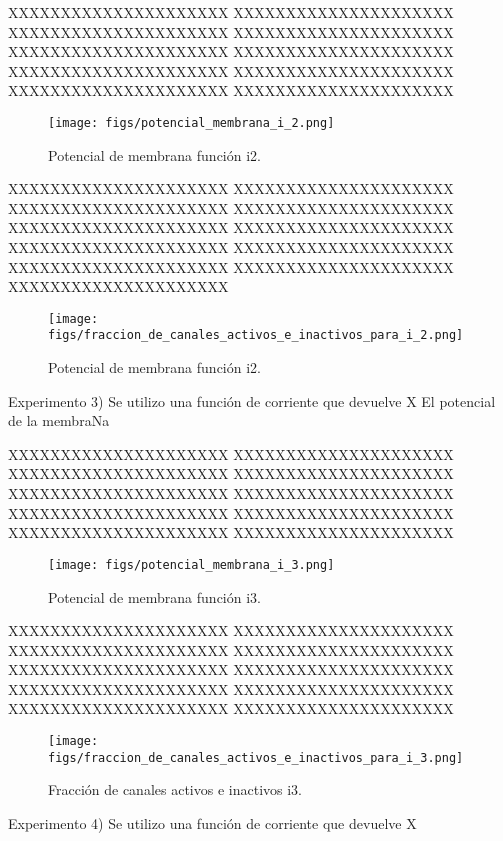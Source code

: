 \documentclass[aps,prl,twocolumn,groupedaddress]{revtex4-2}
\begin{document}
XXXXXXXXXXXXXXXXXXXXX
XXXXXXXXXXXXXXXXXXXXX
XXXXXXXXXXXXXXXXXXXXX
XXXXXXXXXXXXXXXXXXXXX
XXXXXXXXXXXXXXXXXXXXX
XXXXXXXXXXXXXXXXXXXXX
XXXXXXXXXXXXXXXXXXXXX
XXXXXXXXXXXXXXXXXXXXX
XXXXXXXXXXXXXXXXXXXXX
XXXXXXXXXXXXXXXXXXXXX


\begin{figure}[h!]
\centering
\texttt{[image: figs/potencial\_membrana\_i\_2.png]}
\caption{Potencial de membrana función i2. \label{fig3}}
\end{figure}


XXXXXXXXXXXXXXXXXXXXX
XXXXXXXXXXXXXXXXXXXXX
XXXXXXXXXXXXXXXXXXXXX
XXXXXXXXXXXXXXXXXXXXX
XXXXXXXXXXXXXXXXXXXXX
XXXXXXXXXXXXXXXXXXXXX
XXXXXXXXXXXXXXXXXXXXX
XXXXXXXXXXXXXXXXXXXXX
XXXXXXXXXXXXXXXXXXXXX
XXXXXXXXXXXXXXXXXXXXX
XXXXXXXXXXXXXXXXXXXXX


\begin{figure}[h!]
\centering
\texttt{[image: figs/fraccion\_de\_canales\_activos\_e\_inactivos\_para\_i\_2.png]}
\caption{Potencial de membrana función i2. \label{fig4}}
\end{figure}

Experimento 3) Se utilizo una función de corriente que devuelve X
El potencial de la membraNa

XXXXXXXXXXXXXXXXXXXXX
XXXXXXXXXXXXXXXXXXXXX
XXXXXXXXXXXXXXXXXXXXX
XXXXXXXXXXXXXXXXXXXXX
XXXXXXXXXXXXXXXXXXXXX
XXXXXXXXXXXXXXXXXXXXX
XXXXXXXXXXXXXXXXXXXXX
XXXXXXXXXXXXXXXXXXXXX
XXXXXXXXXXXXXXXXXXXXX
XXXXXXXXXXXXXXXXXXXXX


\begin{figure}[h!]
\centering
\texttt{[image: figs/potencial\_membrana\_i\_3.png]}
\caption{Potencial de membrana función i3. \label{fig5}}
\end{figure}
XXXXXXXXXXXXXXXXXXXXX
XXXXXXXXXXXXXXXXXXXXX
XXXXXXXXXXXXXXXXXXXXX
XXXXXXXXXXXXXXXXXXXXX
XXXXXXXXXXXXXXXXXXXXX
XXXXXXXXXXXXXXXXXXXXX
XXXXXXXXXXXXXXXXXXXXX
XXXXXXXXXXXXXXXXXXXXX
XXXXXXXXXXXXXXXXXXXXX
XXXXXXXXXXXXXXXXXXXXX


\begin{figure}[h!]
\centering
\texttt{[image: figs/fraccion\_de\_canales\_activos\_e\_inactivos\_para\_i\_3.png]}
\caption{Fracción de canales activos e inactivos i3. \label{fig6}}
\end{figure}

Experimento 4) Se utilizo una función de corriente que devuelve X
\end{document}
